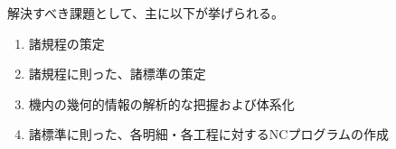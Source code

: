 解決すべき課題として、主に以下が挙げられる。
\begin{enumerate}[label=\sarrow]
\item 諸規程の策定
\item 諸規程に則った、諸標準の策定
\item 機内の幾何的情報の解析的な把握および体系化
\item 諸標準に則った、各明細・各工程に対するNCプログラムの作成
\end{enumerate}

